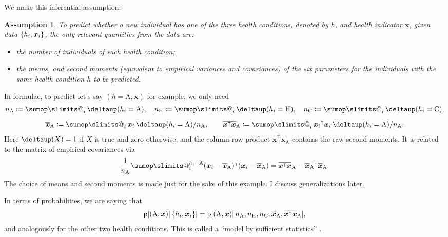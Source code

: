 \documentclass[\ifafour a4paper,12pt,\else a5paper,10pt,\fi%
onecolumn,oneside,article,%
british%
]{memoir}
\makeatletter
\theoremstyle{remark}
\theoremstyle{innote}
\def\sum{\DOTSI\sumop\slimits@}
\newcommand*{\citep}{\parencites}
\newcommand*{\delt}{\deltaup}%
\newcommand*{\defd}{\coloneqq}
\DeclarePairedDelimiter\set{\{}{\}}
\newcommand*{\pf}{\mathrm{p}}%
\renewcommand*{\|}{\mathpunct{|}}
\newcommand*{\chap}{ch.}%
\newcommand*{\tsum}{\mathop{\textstyle\sum}\nolimits}
\newcommand*{\T}{^\intercal}%
\newcommand*{\yH}{h}
\newcommand*{\yx}{x}
\newcommand*{\yxx}{\bm{\yx}}
\newcommand*{\ya}{\mathrm{A}}
\newcommand*{\yi}{\mathrm{C}}
\newcommand*{\yh}{\mathrm{H}}
\newcommand*{\yn}{n}
\newcommand*{\yna}{\yn_{\ya}}
\newcommand*{\ynh}{\yn_{\yh}}
\newcommand*{\yni}{\yn_{\yi}}
\newcommand*{\vxxa}{\overline{\yxx}_{\ya}}
\newcommand*{\vxta}{\overline{\yxx\T\yxx}_{\ya}}
\theoremstyle{plain}
\newtheorem*{assumption}{Assumption}
\makeatother
\begin{document}
\medskip

We make this inferential assumption:
\begin{assumption}
  \label{thm:assumption}
  To predict whether a new individual has one of the three health
  conditions, denoted by $\yH$, and health indicator $\yxx$, given data
  $\set{\yH_i,\yxx_i}$, the only relevant quantities from the data are:
  \begin{itemize}
  \item the  number of individuals of each health condition;
  \item the means, and second moments (equivalent to empirical variances
    and covariances) of the six parameters for the individuals with the
    \emph{same} health condition $\yH$ to be predicted.
  \end{itemize}
\end{assumption}
In formulae, to predict let's say $(\yH=\ya, \yxx)$ for example, we only
need
\begin{equation}
    \label{eq:assumption}
    \begin{gathered}
      \yna \defd \tsum_i \delt(\yH_i=\ya),
\quad      \ynh \defd \tsum_i \delt(\yH_i=\yh),
\quad      \yni \defd \tsum_i \delt(\yH_i=\yi),
      \\[2\jot]
      \vxxa \defd \tsum_i \yxx_i\, \delt(\yH_i=\ya)/\yna,
\qquad      \vxta \defd \tsum_i {\yxx_i}\T\yxx_i \, \delt(\yH_i=\ya)/\yna.
    \end{gathered}
\end{equation}
Here $\delt(X)=1$ if $X$ is true and zero otherwise, and the column-row
product $\vxta$ contains the raw second moments. It is related to the
matrix of empirical covariances via
\begin{equation}
  \label{eq:raw_moments_to_covariances}
  \frac{1}{\yna}\sum_i^{\yH_i=\ya}(\yxx_i-\vxxa)\T(\yxx_i-\vxxa) =
  \vxta - {\vxxa}\T\vxxa.
\end{equation}
The choice of means and second moments is made just for the sake of this
example. I discuss generalizations later.

In terms of probabilities, we are saying that
\begin{equation}
  \label{eq:assumption_probability}
  \pf[(\ya,\yxx) \| \set{\yH_i,\yxx_i}] =
  \pf[(\ya,\yxx) \|
  \yna,\ynh,\yni,\vxxa,\vxta ],
\end{equation}
and analogously for the other two health conditions. This is called a
\enquote{model by sufficient statistics}
\citep[\chap~4]{bernardoetal1994_r2000}.
\end{document}
